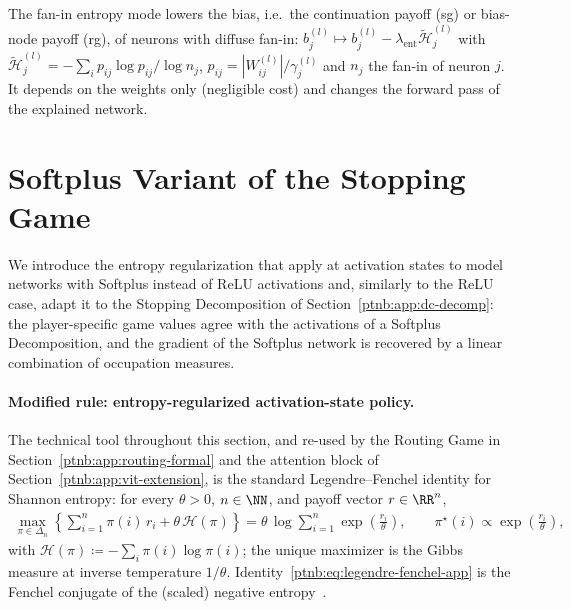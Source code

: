 The fan-in entropy mode lowers the bias, i.e.\ the continuation payoff (\ac{sg}) or bias-node
payoff (\ac{rg}), of neurons with diffuse fan-in: $b_j^{(l)} \mapsto b_j^{(l)} -
    \lambda_{\mathrm{ent}}\tilde{\mathcal{H}}_j^{(l)}$ with $\tilde{\mathcal{H}}_j^{(l)} = -\sum_i
    p_{ij}\log p_{ij}/\log n_j$, $p_{ij} = |W_{ij}^{(l)}|/\gamma_j^{(l)}$ and $n_j$ the fan-in of
neuron $j$. It depends on the weights only (negligible cost) and changes the forward pass of the
explained network.
\par\medskip
\section{Softplus Variant of the Stopping Game}\label{ptnb:app:softplus-stopping-game}

We introduce the entropy regularization that \textcite{Gaubert2025} apply at activation states to
model networks with Softplus instead of ReLU activations and, similarly to the ReLU case, adapt it
to the Stopping Decomposition of Section~\ref{ptnb:app:dc-decomp}: the player-specific game values
agree with the activations of a Softplus Decomposition, and the gradient of the Softplus network is
recovered by a linear combination of occupation measures.

\paragraph{Modified rule: entropy-regularized activation-state policy.}\label{ptnb:app:softplus-rules}
The technical tool throughout this section, and re-used by the Routing Game in
Section~\ref{ptnb:app:routing-formal} and the attention block of Section~\ref{ptnb:app:vit-extension}, is
the standard Legendre--Fenchel identity for Shannon entropy: for every $\theta>0$, $n\in\NN$, and
payoff vector $r \in \RR^n$,
\begin{align}\label{ptnb:eq:legendre-fenchel-app}
    \max_{\pi \in \Delta_n} \left\{ \sum_{i=1}^n \pi(i)\, r_i + \theta\, \mathcal{H}(\pi) \right\}
    = \theta\, \log \sum_{i=1}^n \exp\!\left(\frac{r_i}{\theta}\right),
    \qquad \pi^\star(i) \propto \exp\!\left(\frac{r_i}{\theta}\right),
\end{align}
with $\mathcal{H}(\pi) \coloneqq -\sum_i \pi(i)\log \pi(i)$; the unique maximizer is the Gibbs
measure at inverse temperature $1/\theta$. Identity~\eqref{ptnb:eq:legendre-fenchel-app} is the Fenchel
conjugate of the (scaled) negative entropy~\parencite{BoydVandenberghe2004}.

